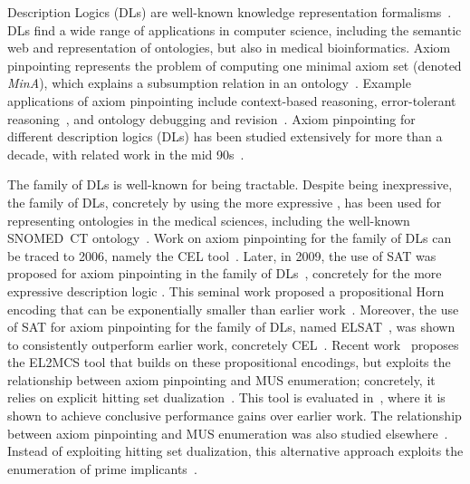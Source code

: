 \documentclass{llncs}
\newcommand{\elplus}{\xspace}
\newcommand{\elplain}{\xspace}
\newcommand{\elsat}{ELSAT\xspace}
\begin{document}
Description Logics (DLs) are well-known knowledge representation
formalisms~\cite{baader-hdbk08}. DLs find a wide range of applications
in computer science, including the semantic web and representation
of ontologies, but also in medical bioinformatics. 
Axiom pinpointing represents the problem of computing one minimal axiom
set (denoted {\em MinA}), which explains a subsumption relation in an
ontology~\cite{schlobach-ijcai03}. 
Example applications of axiom pinpointing include context-based
reasoning, error-tolerant reasoning~\cite{ludwig-jelia14}, and
ontology debugging and revision~\cite{schlobach-jar07,kalyanpur-eswc06}.
Axiom pinpointing for different description logics (DLs) has been
studied extensively for more than a decade, with related work in the
mid
90s~\cite{baader-jar95,schlobach-ijcai03,parsia-www05,meyer-aaai06,baader-ijcar06,baader-ki07,parsia-iswc07,parsia-jws07,schlobach-jar07,baader-krmed08,sebastiani-cade09,baader-jlc10,meyer-rr11,nguyen-dl12,ludwig-ore14,sebastiani-tr15,ams-corr15,mp-tr15}.

The \elplain family of DLs is well-known for being tractable. Despite
being inexpressive, the \elplain family of DLs, concretely by using
the more expressive \elplus, has been used for representing ontologies
in the medical sciences, including the well-known SNOMED~CT
ontology~\cite{spackman-amia97}.
Work on axiom pinpointing for the \elplain family of DLs can be traced
to 2006, namely the CEL tool~\cite{baader-ijcar06}.
Later, in 2009, the use of SAT was proposed for axiom pinpointing in
the \elplain family of
DLs~\cite{sebastiani-cade09,vescovi-phd11,sebastiani-tr15}, concretely
for the more expressive description logic \elplus. This seminal work
proposed a propositional Horn encoding that can be exponentially
smaller than earlier
work~\cite{baader-ijcar06,baader-ki07,baader-krmed08}. Moreover, the
use of SAT for axiom pinpointing for the \elplain family of DLs, named 
\elsat~\cite{sebastiani-cade09,vescovi-phd11,sebastiani-tr15}, was
shown to consistently outperform earlier work, concretely
CEL~\cite{baader-ijcar06}. 
Recent work~\cite{ams-corr15} proposes the EL2MCS tool that builds on these propositional encodings,
but exploits the relationship between axiom pinpointing and MUS
enumeration; concretely, it relies on explicit hitting set dualization~\cite{liffiton-jar08}. 
This tool is evaluated in~\cite{ams-corr15}, where it is shown to achieve conclusive 
performance gains over earlier work.
The relationship between axiom pinpointing and MUS enumeration was
also studied elsewhere~\cite{mp-tr15}. Instead of exploiting hitting
set dualization, this alternative approach exploits the enumeration of
prime implicants~\cite{mp-tr15}.
\end{document}
